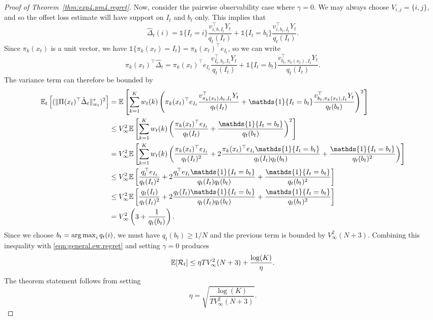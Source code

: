\documentclass{article}
\newcommand{\regret}{\mathcal{R}}
\begin{document}
\begin{proof}[Proof of Theorem~\ref{thm:exp4.pm4.regret}]
Now, consider the pairwise observability case where $\gamma=0$. We may always choose $V_{i,j} = \{i,j\}$, and so the offset loss estimate will have support on $I_t$ and $b_t$ only. This implies that 
\[
  \hat\Delta_t(i) = \mathds{1}\{I_t = i\} \frac{v_{i,b,I_t}^\top Y_t}{q_t(I_t)}
  +
  \mathds{1}\{I_t = b_t\} \frac{v_{i,b_t,I_t}^\top Y_t}{q_t(I_t)}.
\]
Since $\pi_k(x_t)$ is a unit vector, we have $\mathds{1}\{ \pi_k(x_t) = I_t\} = \pi_k(x_t)^\top e_{I_t}$, so we can write
\[
  \pi_k(x_t)^\top \hat\Delta_t
  =
  \pi_k(x_t)^\top e_{I_t}
   \frac{v_{I_t,b_t,I_t}^\top Y_t}{q_t(I_t)}
  +
  \mathds{1}\{I_t = b_t\} \frac{v_{b_t,\pi_k(x_t),I_t}^\top Y_t}{q_t(I_t)}.
\]
The variance term can therefore be bounded by
\begin{align*}
  \ex_t\left[(\Vert \Pi(x_t)^\top\hat\Delta_t\Vert_{w_t}^*)^2\right]
  &=
  \ex \left[ \sum_{k=1}^K w_t(k)
    \left(
    \pi_k(x_t)^\top e_{I_t} \frac{v_{\pi_k(x_t),b_t,I_t}^\top Y_t}{q_t(I_t)}
    +
    \mathds{1}\{I_t = b_t\} \frac{v_{b_t,\pi_k(x_t),I_t}^\top Y_t}{q_t(b_t)}
    \right)^2\right]\\
  &\leq
    V_\infty^2
    \ex \left[ \sum_{k=1}^K w_t(k)
    \left(
    \frac{\pi_k(x_t)^\top e_{I_t} }{q_t(I_t)}
    +
    \frac{\mathds{1}\{I_t = b_t\} }{q_t(b_t)}
    \right)^2\right]\\
    &=
    V_\infty^2
    \ex \left[ \sum_{k=1}^K w_t(k)
    \left(
      \frac{\pi_k(x_t)^\top e_{I_t} }{q_t(I_t)^2}
      + 2
      \frac{\pi_k(x_t)^\top e_{I_t}\mathds{1}\{I_t = b_t\} }{q_t(I_t)q_t(b_t)}
    +
    \frac{\mathds{1}\{I_t = b_t\} }{q_t(b_t)^2}
      \right)\right]\\
  &\leq
    V_\infty^2
    \ex \left[
      \frac{q_t^\top e_{I_t} }{q_t(I_t)^2}
    +
    2 \frac{q_t^\top e_{I_t}\mathds{1}\{I_t = b_t\} }{q_t(I_t)q_t(b_t)}
    +  
    \frac{\mathds{1}\{I_t = b_t\} }{q_t(b_t)^2}
    \right]\\
  &\leq
    V_\infty^2
    \ex \left[
    \frac{q_t(I_t) }{q_t(I_t)^2}
    +
    2 \frac{q_t(I_t)\mathds{1}\{I_t = b_t\} }{q_t(I_t)q_t(b_t)}
    +  
    \frac{\mathds{1}\{I_t = b_t\} }{q_t(b_t)^2}
    \right]\\
  &=
    V_\infty^2\left(    
    3
    +  
    \frac{1 }{q_t(b_t)}
    \right).
\end{align*}
Since we choose $b_t = \operatorname*{arg\,max}_i q_t(i)$, we must have $q_t(b_t)\geq 1/N$ and the previous term is bounded by $V_\infty^2(N+3)$. Combining this inequality with \eqref{eqn:general.ew.regret} and setting $\gamma=0$ produces
\begin{equation*}
  \ex[\regret_t] \leq
  \eta T V_\infty^2(N+3)
  + \frac{\log (K)}{\eta}.
\end{equation*}
The theorem statement follows from setting
\[
  \eta = \sqrt{ \frac{\log(K)}{ T V_\infty^2 (N+3)}}.
\]
\end{proof}
\end{document}

